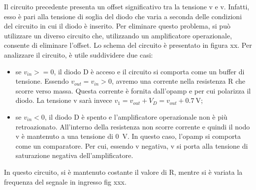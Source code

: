 Il circuito precedente presenta un offset significativo tra la tensione v e v. Infatti, esso è pari alla tensione di soglia del diodo che varia a seconda delle condizioni del circuito in cui il diodo è inserito. Per eliminare questo problema, si può utilizzare un diverso circuito che, utilizzando un amplificatore operazionale, consente di eliminare l'offset. Lo schema del circuito è presentato in figura xx.
Per analizzare il circuito, è utile suddividere due casi:
\begin{itemize}
	\item se $v_{in}>=0$, il diodo D è acceso e il circuito si comporta come un buffer di tensione. Essendo $v_{out}=v_{in}>0$, avremo una corrente nella resistenza R che scorre verso massa. Questa corrente è fornita dall'opamp e per cui polarizza il diodo. La tensione v sarà invece $v_1=v_{out}+V_D=v_{out}+\SI{0.7}{\volt}$;
	\item se $v_{in}<0$, il diodo D è spento e l'amplificatore operazionale non è più retroazionato. All'interno della resistenza non scorre corrente e quindi il nodo v è mantenuto a una tensione di \SI{0}{\volt}. In questo caso, l'opamp si comporta come un comparatore. Per cui, essendo v negativa, v si porta alla tensione di saturazione negativa dell'amplificatore.
\end{itemize}
In questo circuito, si è mantenuto costante il valore di R, mentre si è variata la frequenza del segnale in ingresso fig xxx.
